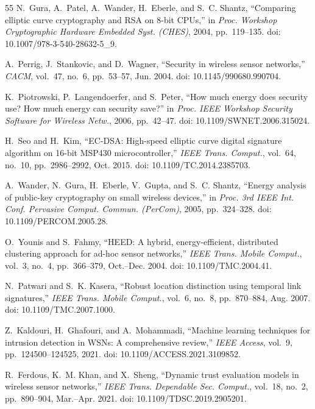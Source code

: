 \documentclass[journal]{IEEEtran}
\begin{document}
\begin{thebibliography}{55}
N.~Gura, A.~Patel, A.~Wander, H.~Eberle, and S.~C. Shantz, ``Comparing elliptic curve cryptography and RSA on 8-bit CPUs,'' in \textit{Proc. Workshop Cryptographic Hardware Embedded Syst. (CHES)}, 2004, pp.~119--135. doi: 10.1007/978-3-540-28632-5_9.

A.~Perrig, J.~Stankovic, and D.~Wagner, ``Security in wireless sensor networks,'' \textit{CACM}, vol.~47, no.~6, pp.~53--57, Jun. 2004. doi: 10.1145/990680.990704.

K.~Piotrowski, P.~Langendoerfer, and S.~Peter, ``How much energy does security use? How much energy can security save?'' in \textit{Proc. IEEE Workshop Security Software for Wireless Netw.}, 2006, pp.~42--47. doi: 10.1109/SWNET.2006.315024.

H.~Seo and H.~Kim, ``EC-DSA: High-speed elliptic curve digital signature algorithm on 16-bit MSP430 microcontroller,'' \textit{IEEE Trans. Comput.}, vol.~64, no.~10, pp.~2986--2992, Oct. 2015. doi: 10.1109/TC.2014.2385703.

A.~Wander, N.~Gura, H.~Eberle, V.~Gupta, and S.~C. Shantz, ``Energy analysis of public-key cryptography on small wireless devices,'' in \textit{Proc. 3rd IEEE Int. Conf. Pervasive Comput. Commun. (PerCom)}, 2005, pp.~324--328. doi: 10.1109/PERCOM.2005.28.

O.~Younis and S.~Fahmy, ``HEED: A hybrid, energy-efficient, distributed clustering approach for ad-hoc sensor networks,'' \textit{IEEE Trans. Mobile Comput.}, vol.~3, no.~4, pp.~366--379, Oct.--Dec. 2004. doi: 10.1109/TMC.2004.41.

N.~Patwari and S.~K. Kasera, ``Robust location distinction using temporal link signatures,'' \textit{IEEE Trans. Mobile Comput.}, vol.~6, no.~8, pp.~870--884, Aug. 2007. doi: 10.1109/TMC.2007.1000.

Z.~Kaldouri, H.~Ghafouri, and A.~Mohammadi, ``Machine learning techniques for intrusion detection in WSNs: A comprehensive review,'' \textit{IEEE Access}, vol.~9, pp.~124500--124525, 2021. doi: 10.1109/ACCESS.2021.3109852.

R.~Ferdous, K.~M. Khan, and X.~Sheng, ``Dynamic trust evaluation models in wireless sensor networks,'' \textit{IEEE Trans. Dependable Sec. Comput.}, vol.~18, no.~2, pp.~890--904, Mar.--Apr. 2021. doi: 10.1109/TDSC.2019.2905201.


\end{thebibliography}
\end{document}
